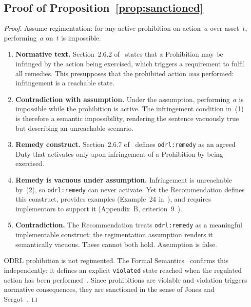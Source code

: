 \documentclass{IOS-Book-Article}
\theoremstyle{definition}
\begin{document}
\subsection*{Proof of Proposition~\ref{prop:sanctioned}}
\label{app:proof:sanctioned}
\begin{proof}
Assume regimentation: for any active prohibition on action~$a$
over asset~$t$, performing~$a$ on~$t$ is impossible.
\begin{enumerate}[label=(\arabic*), leftmargin=*, itemsep=4pt]
  \item \textbf{Normative text.}
    Section~2.6.2 of~\cite{iannella2018odrl} states that a
    Prohibition may be infringed by the action being exercised,
    which triggers a requirement to fulfil all remedies.
    This presupposes that the prohibited action \emph{was}
    performed: infringement is a reachable state.
  \item \textbf{Contradiction with assumption.}
    Under the assumption, performing~$a$ is impossible while
    the prohibition is active. The infringement condition
    in~(1) is therefore a semantic impossibility, rendering
    the sentence vacuously true but describing an unreachable
    scenario.
  \item \textbf{Remedy construct.}
    Section~2.6.7 of~\cite{iannella2018odrl} defines
    \texttt{odrl:remedy} as an agreed Duty that activates
    only upon infringement of a Prohibition by being exercised.
  \item \textbf{Remedy is vacuous under assumption.}
    Infringement is unreachable by~(2), so
    \texttt{odrl:remedy} can never activate. Yet the
    Recommendation defines this construct, provides examples
    (Example~24 in~\cite{iannella2018odrl}), and requires
    implementors to support it (Appendix~B,
    criterion~9~\cite{iannella2018odrl}).
  \item \textbf{Contradiction.}
    The Recommendation treats \texttt{odrl:remedy} as a
    meaningful implementable construct; the regimentation
    assumption renders it semantically vacuous. These cannot
    both hold. Assumption is false.
\end{enumerate}
ODRL prohibition is not regimented. The Formal
Semantics~\cite{odrl-formal-semantics} confirms this
independently: it defines an explicit \texttt{violated}
state reached when the regulated action has been
performed~\cite{odrl-formal-semantics}. Since
prohibitions are violable and violation triggers normative
consequences, they are sanctioned in the sense of Jones and
Sergot~\cite{jones1996formal}.
\end{proof}
\end{document}
